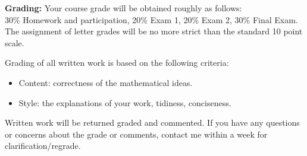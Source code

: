 \documentclass[11pt]{amsart}
\begin{document}

\vspace{10pt}
\noindent \textbf{Grading:} 
Your course grade will be obtained roughly as follows:\\ 30\% Homework and participation, 20\% Exam 1, 20\% Exam 2, 30\% Final Exam. \\
The assignment of letter grades will be no more strict than the standard 10 point scale.

Grading of all written work is based on the following criteria:
\begin{itemize}
  \item Content: correctness of the mathematical ideas.
  \item Style: the explanations of your work, tidiness, conciseness.
\end{itemize}
Written work will be returned graded and commented.  If you have any questions or concerns about the grade or comments, contact me within a week for clarification/regrade.
\end{document}
